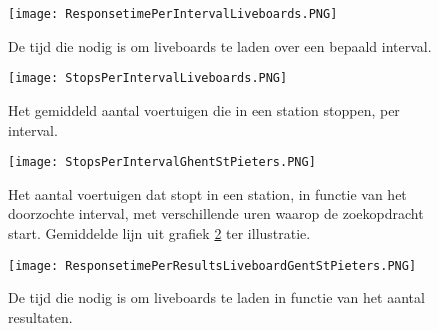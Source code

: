 \begin{figure}
	\centering
	\texttt{[image: ResponsetimePerIntervalLiveboards.PNG]}
	\caption[Laadtijd liveboards in functie van het overlopen interval]{De tijd die nodig is om liveboards te laden over een bepaald interval.}
	\label{fig:responsetimeperintervalliveboards}
\end{figure}

\begin{figure}
	\centering
	\texttt{[image: StopsPerIntervalLiveboards.PNG]}
	\caption[Het gemiddeld aantal voertuigen die stoppen per interval in een station]{Het gemiddeld aantal voertuigen die in een station stoppen, per interval.}
	\label{fig:stopsperintervalliveboards}
\end{figure}
\begin{figure}
	\centering
	\texttt{[image: StopsPerIntervalGhentStPieters.PNG]}
	\caption[Het aantal voertuigen dat stopt in Gent-St-Pieters]{Het aantal voertuigen dat stopt in een station, in functie van het doorzochte interval, met verschillende uren waarop de zoekopdracht start. Gemiddelde lijn uit grafiek \ref{fig:stopsperintervalliveboards} ter illustratie.}
	\label{fig:stopsperintervaldetail}
\end{figure}

\begin{figure}
	\centering
	\texttt{[image: ResponsetimePerResultsLiveboardGentStPieters.PNG]}
	\caption[Laadtijd liveboards in functie van het aantal resultaten]{De tijd die nodig is om liveboards te laden in functie van het aantal resultaten.}
	\label{fig:responsetimeperresultsliveboards}
\end{figure}

